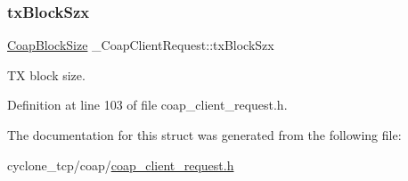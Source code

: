 \mbox{\label{struct__CoapClientRequest_a0eedb06014e31a9d221ea39badff8b04}} 
\subsubsection{\texorpdfstring{tx\+Block\+Szx}{txBlockSzx}}
{\footnotesize\ttfamily \hyperlink{coap__option_8h_ad1e9eed649f4a72e0e2219dae49cbae8}{Coap\+Block\+Size} \+\_\+\+Coap\+Client\+Request\+::tx\+Block\+Szx}



TX block size. 



Definition at line 103 of file coap\+\_\+client\+\_\+request.\+h.



The documentation for this struct was generated from the following file\+:\begin{DoxyCompactItemize}
\item 
cyclone\+\_\+tcp/coap/\hyperlink{coap__client__request_8h}{coap\+\_\+client\+\_\+request.\+h}\end{DoxyCompactItemize}
